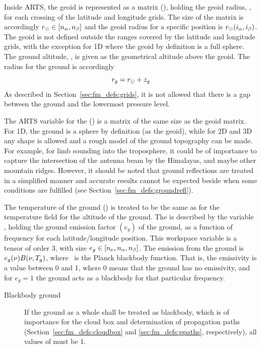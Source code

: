 Inside ARTS, the geoid is represented as a matrix (),
holding the geoid radius, \aRds{\odot}, for each crossing of the latitude and
longitude grids. The size of the matrix is accordingly $r_{\odot}
\in [n_{\alpha},n_{\beta}]$ and the geoid radius for a
specific position is $r_{\odot}(i_{\alpha},i_{\beta})$. The
geoid is not defined outside the ranges covered by the latitude and
longitude grids, with the exception for 1D where the geoid by
definition is a full sphere. 
The ground altitude, , is given as the geometrical altitude
above the geoid. The radius for the ground is accordingly
\begin{equation}
  r_{g} = r_{\odot} + z_{g}
 \label{eq:fm_defs:zground}
\end{equation}
As described in
Section~\ref{sec:fm_defs:grids}, it is not allowed that there is a gap
between the ground and the lowermost pressure level.

The ARTS variable for the 
() is a matrix of the same size as the geoid
matrix. For 1D, the ground is a sphere by definition (as the geoid),
while for 2D and 3D any shape is allowed and a rough model of the
ground topography can be made. For example, for limb sounding into the
troposphere, it could be of importance to capture the intersection of
the antenna beam by the Himalayas, and maybe other mountain ridges.
However, it should be noted that ground reflections are treated in a
simplified manner and accurate results cannot be expected beside when
some conditions are fulfilled (see
Section~\ref{sec:fm_defs:groundrefl}).

The temperature of the ground () is
treated to be the same as for the temperature field for the altitude
of the ground. The  is described by the
variable , holding the ground emission factor
$(e_g)$ of the ground, as a function of frequency for each
latitude/longitude position. This workspace variable is a tensor of
order 3, with size $e_g \in
[n_{\nu},n_{\alpha},n_{\beta}]$.  The emission from
the ground is $e_g(\nu)B(\nu,T_{g})$, where \Planck\ is the
Planck blackbody function. That is, the emissivity is a value between
0 and 1, where 0 means that the ground has no emissivity, and for
$e_g=1$ the ground acts as a blackbody for that particular frequency.

\begin{description}
\item[Blackbody ground] If the ground as a
  whole shall be treated as blackbody, which is of importance for the
  cloud box and determination of propagation paths
  (Section~\ref{sec:fm_defs:cloudbox} and \ref{sec:fm_defs:ppaths},
  respectively), all values of  must be 1.
\end{description}


